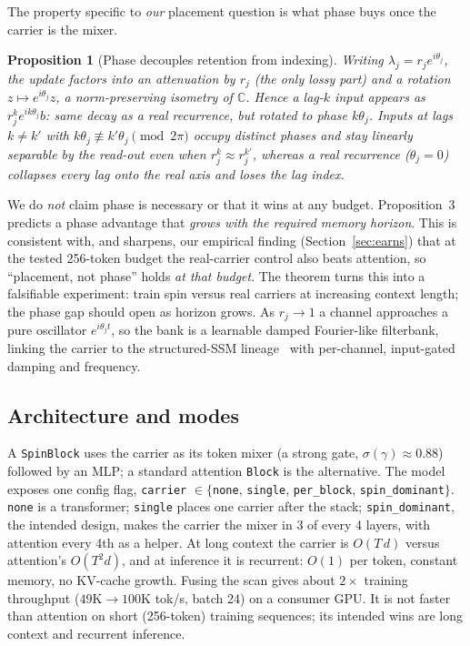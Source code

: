 \documentclass[journal]{IEEEtran}
\newtheorem{proposition}{Proposition}
\newcommand{\code}[1]{\texttt{#1}}
\begin{document}
The property specific to \emph{our} placement question is what phase buys once the carrier is the mixer.
\begin{proposition}[Phase decouples retention from indexing]
Writing $\lambda_j=r_j e^{i\theta_j}$, the update factors into an attenuation by $r_j$ (the only lossy part) and a rotation $z\mapsto e^{i\theta_j}z$, a norm-preserving isometry of $\mathbb{C}$. Hence a lag-$k$ input appears as $r_j^k e^{ik\theta_j}b$: same decay as a real recurrence, but rotated to phase $k\theta_j$. Inputs at lags $k\neq k'$ with $k\theta_j\not\equiv k'\theta_j \pmod{2\pi}$ occupy distinct phases and stay linearly separable by the read-out even when $r_j^k\approx r_j^{k'}$, whereas a real recurrence ($\theta_j=0$) collapses every lag onto the real axis and loses the lag index.
\end{proposition}
\noindent We do \emph{not} claim phase is necessary or that it wins at any budget. Proposition~3 predicts a phase advantage that \emph{grows with the required memory horizon}. This is consistent with, and sharpens, our empirical finding (Section~\ref{sec:earns}) that at the tested 256-token budget the real-carrier control also beats attention, so ``placement, not phase'' holds \emph{at that budget}. The theorem turns this into a falsifiable experiment: train spin versus real carriers at increasing context length; the phase gap should open as horizon grows. As $r_j\to1$ a channel approaches a pure oscillator $e^{i\theta_j t}$, so the bank is a learnable damped Fourier-like filterbank, linking the carrier to the structured-SSM lineage~\cite{gu2022s4,gu2022s4d} with per-channel, input-gated damping and frequency.

\subsection{Architecture and modes}
A \code{SpinBlock} uses the carrier as its token mixer (a strong gate, $\sigma(\gamma)\approx0.88$) followed by an MLP; a standard attention \code{Block} is the alternative. The model exposes one config flag, \code{carrier} $\in \{$\code{none}, \code{single}, \code{per\_block}, \code{spin\_dominant}$\}$. \code{none} is a transformer; \code{single} places one carrier after the stack; \code{spin\_dominant}, the intended design, makes the carrier the mixer in 3 of every 4 layers, with attention every 4th as a helper. At long context the carrier is $O(T\,d)$ versus attention's $O(T^2 d)$, and at inference it is recurrent: $O(1)$ per token, constant memory, no KV-cache growth. Fusing the scan gives about $2\times$ training throughput ($49\text{K} \to 100\text{K}$ tok/s, batch 24) on a consumer GPU. It is not faster than attention on short (256-token) training sequences; its intended wins are long context and recurrent inference.
\end{document}
